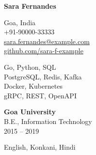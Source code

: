 \documentclass[10pt]{article}
\newcommand{\sidehead}[1]{\vspace{9pt}{\large\bfseries #1}\par\vspace{3pt}}
\begin{document}
{\Huge\bfseries Sara Fernandes}\par
\vspace{4pt}{\large Backend Engineer}\par
\vspace{6pt}

\begin{minipage}[t]{0.29\textwidth}
\sidehead{Contact}
Goa, India\\
+91-90000-33333\\
\href{mailto:sara.fernandes@example.com}{sara.fernandes@example.com}\\
\href{https://github.com/sara-f-example}{github.com/sara-f-example}

\sidehead{Skills}
Go, Python, SQL\\
PostgreSQL, Redis, Kafka\\
Docker, Kubernetes\\
gRPC, REST, OpenAPI

\sidehead{Education}
\textbf{Goa University}\\
B.E., Information Technology\\
2015 -- 2019

\sidehead{Languages}
English, Konkani, Hindi
\end{minipage}\hfill
\end{document}
